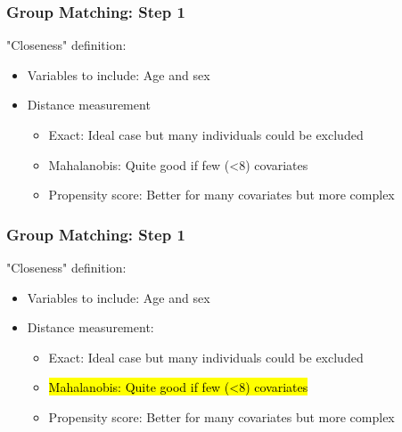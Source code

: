 \documentclass[xcolor=table]{beamer}
\makeatletter
\let\HL\hl
\renewcommand\hl{%
	\let\set@color\beamerorig@set@color
	\let\reset@color\beamerorig@reset@color
	\HL}
\makeatother
\begin{document}

\begin{frame}
	\frametitle{Group Matching: Step 1}
	"Closeness" definition:
	\begin{itemize}[label=$\bullet$]
		\item Variables to include: Age and sex
		\item Distance measurement
		\begin{itemize}[label=$-$]
			\item Exact: Ideal case but many individuals could be excluded
			\item Mahalanobis: Quite good if few (<8) covariates
			\item Propensity score: Better for many covariates but more complex
		\end{itemize}
		
	\end{itemize}
\end{frame}


\begin{frame}[noframenumbering]
	\frametitle{Group Matching: Step 1}
	"Closeness" definition:
	\begin{itemize}[label=$\bullet$]
		\item Variables to include: Age and sex
		\item Distance measurement:
		\begin{itemize}[label=$-$]
			\item Exact: Ideal case but many individuals could be excluded
			\item \hl{Mahalanobis: Quite good if few (<8) covariates}
			\item Propensity score: Better for many covariates but more complex
		\end{itemize}
	\end{itemize}
\end{frame}

\end{document}
